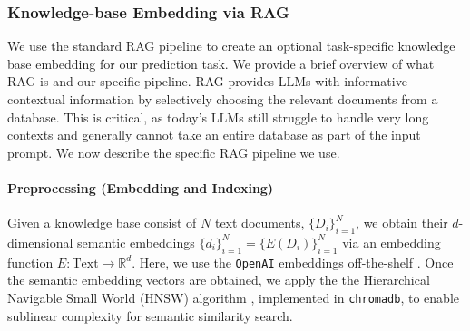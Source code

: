 


\subsubsection{Knowledge-base Embedding via RAG}\label{subsec:knowledge}
We use the standard RAG pipeline to create an optional task-specific knowledge base embedding for our prediction task. 
We provide a brief overview of what RAG is and our specific pipeline.
RAG provides LLMs with informative contextual information by selectively choosing the relevant documents from a database. This is critical, as today's LLMs still struggle to handle very long contexts and generally cannot take an entire database as part of the input prompt.
We now describe the specific RAG pipeline we  use. 

\paragraph{Preprocessing (Embedding and Indexing)}
Given a knowledge base consist of $N$ text documents, $\{D_i\}_{i=1}^N$, we obtain their $d$-dimensional semantic embeddings $\{d_i\}_{i=1}^N = \{E(D_i)\}_{i=1}^N$ via an embedding function $E: \text{Text} \rightarrow \mathbb{R}^d$. 
Here, we use the \texttt{OpenAI} embeddings off-the-shelf \citep{openai_embeddings}. 
Once the semantic embedding vectors are obtained, we apply the the Hierarchical Navigable Small World (HNSW) algorithm \citep{malkov2018hnsw}, implemented in \texttt{chromadb}, to enable sublinear complexity for semantic similarity search.

